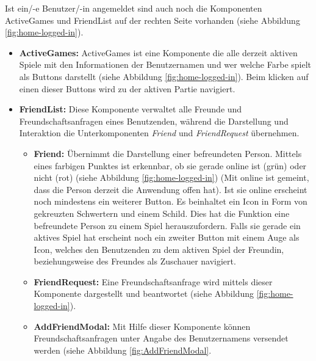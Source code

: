 \begin{itemize}
 Ist ein/-e Benutzer/-in angemeldet sind auch noch die Komponenten ActiveGames und FriendList auf der rechten Seite vorhanden (siehe Abbildung \ref{fig:home-logged-in}).
\begin{itemize}
\item \textbf{ActiveGames:} ActiveGames ist eine Komponente die alle derzeit aktiven Spiele mit den Informationen der Benutzernamen und wer welche Farbe spielt als Buttons darstellt (siehe Abbildung \ref{fig:home-logged-in}). Beim klicken auf einen dieser Buttons wird zu der aktiven Partie navigiert.
\item \textbf{FriendList:} Diese Komponente verwaltet alle Freunde und Freundschaftsanfragen eines Benutzenden, während die Darstellung und Interaktion die Unterkomponenten \textit{Friend} und \textit{FriendRequest} übernehmen.
\begin{itemize}
\item \textbf{Friend:} Übernimmt die Darstellung einer befreundeten Person. Mittels eines farbigen Punktes ist erkennbar, ob sie gerade online ist (grün) oder nicht (rot) (siehe Abbildung \ref{fig:home-logged-in}) (Mit online ist gemeint, dass die Person derzeit die Anwendung offen hat). Ist sie online erscheint noch mindestens ein weiterer Button. Es beinhaltet ein Icon in Form von gekreuzten Schwertern und einem Schild. Dies hat die Funktion eine befreundete Person zu einem Spiel herauszufordern. Falls sie gerade ein aktives Spiel hat erscheint noch ein zweiter Button mit einem Auge als Icon, welches den Benutzenden zu dem aktiven Spiel der Freundin, beziehungsweise des Freundes als Zuschauer navigiert.
\item \textbf{FriendRequest:} Eine Freundschaftsanfrage wird mittels dieser Komponente dargestellt und beantwortet (siehe Abbildung \ref{fig:home-logged-in}).
\item \textbf{AddFriendModal:} Mit Hilfe dieser Komponente können Freundschaftsanfragen unter Angabe des Benutzernamens versendet werden (siehe Abbildung \ref{fig:AddFriendModal}.
\end{itemize}
\end{itemize}



\end{itemize}
